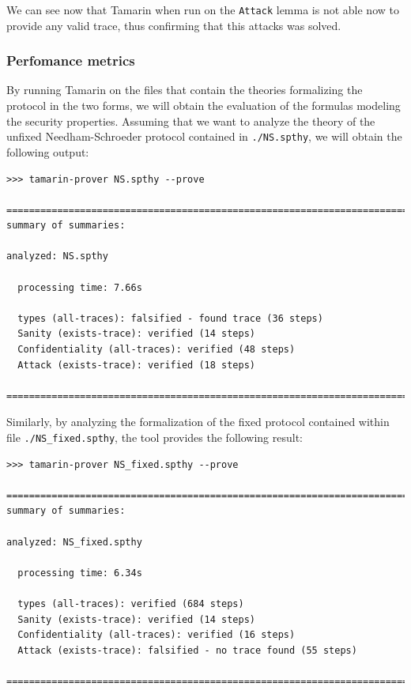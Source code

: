 \documentclass[fleqn,10pt]{SelfArx} %
\begin{document}
We can see now that Tamarin when run on the \lstinline|Attack| lemma is not able now to provide any valid trace, thus confirming that this attacks was solved.

\subsubsection{Perfomance metrics}

By running Tamarin on the files that contain the theories formalizing the protocol in the two forms, we will obtain the evaluation of the formulas modeling the security properties. Assuming that we want to analyze the theory of the unfixed Needham-Schroeder protocol contained in \lstinline|./NS.spthy|, we will obtain the following output:

\begin{lstlisting}[language=Terminal]
>>> tamarin-prover NS.spthy --prove

==============================================================================
summary of summaries:

analyzed: NS.spthy

  processing time: 7.66s
  
  types (all-traces): falsified - found trace (36 steps)
  Sanity (exists-trace): verified (14 steps)
  Confidentiality (all-traces): verified (48 steps)
  Attack (exists-trace): verified (18 steps)

==============================================================================
\end{lstlisting}

Similarly, by analyzing the formalization of the fixed protocol contained within file \lstinline|./NS_fixed.spthy|, the tool provides the following result:

\begin{lstlisting}[language=Terminal]
>>> tamarin-prover NS_fixed.spthy --prove

==============================================================================
summary of summaries:

analyzed: NS_fixed.spthy

  processing time: 6.34s
  
  types (all-traces): verified (684 steps)
  Sanity (exists-trace): verified (14 steps)
  Confidentiality (all-traces): verified (16 steps)
  Attack (exists-trace): falsified - no trace found (55 steps)

==============================================================================
\end{lstlisting}
\end{document}
